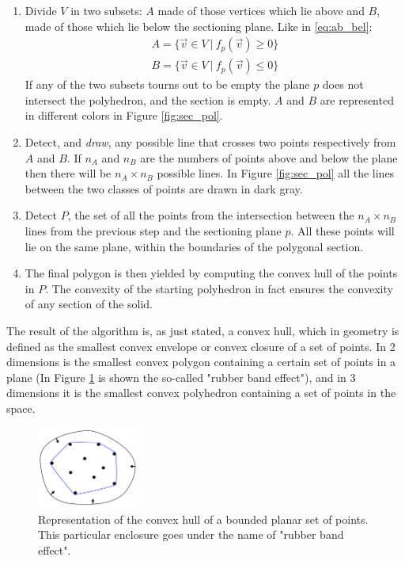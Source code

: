 \begin{enumerate}
    \item Divide $V$ in two subsets: $A$ made of those vertices which lie above and $B$, made of those which lie below the sectioning plane. Like in \ref{eq:ab_bel}:
    \begin{align}
        A = \{ \vec v \in V \ |\ f_p(\vec v)\geq 0\} \label{eq:ab_bel} \\
        B = \{ \vec v \in V \ |\ f_p(\vec v)\leq 0\} \nonumber
    \end{align}
    If any of the two subsets tourns out to be empty the plane $p$ does not intersect the polyhedron, and the section is empty. $A$ and $B$ are represented in different colors in Figure \ref{fig:sec_pol}.

    \item Detect, and \textit{draw}, any possible line that crosses two points respectively from $A$ and $B$. If $n_A$ and $n_B$ are the numbers of points above and below the plane then there will be $n_A \times n_B$ possible lines. In Figure \ref{fig:sec_pol} all the lines between the two classes of points are drawn in dark gray.

    \item Detect $P$, the set of all the points from the intersection between the $n_A \times n_B$ lines from the previous step and the sectioning plane $p$. All these points will lie on the same plane, within the boundaries of the polygonal section.

    \item The final polygon is then yielded by computing the convex hull of the points in $P$. The convexity of the starting polyhedron in fact ensures the convexity of any section of the solid.
\end{enumerate}

The result of the algorithm is, as just stated, a convex hull, which in geometry is defined as the smallest convex envelope or convex closure of a set of points. In 2 dimensions is the smallest convex polygon containing a certain set of points in a plane (In Figure \ref{fig:conv_hull} is shown the so-called "rubber band effect"), and in 3 dimensions it is the smallest convex polyhedron containing a set of points in the space.

\begin{figure}
    \centering
    \includegraphics[width = 0.3\textwidth]{images/conv_hull}
    \caption{Representation of the convex hull of a bounded planar set of points. This particular enclosure goes under the name of "rubber band effect".}
    \label{fig:conv_hull}
\end{figure}


